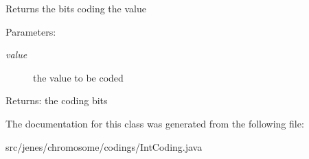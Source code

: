 Returns the bits coding the value

\begin{Desc}
\item[Parameters:]
\begin{description}
\item[{\em value}]the value to be coded \end{description}
\end{Desc}
\begin{Desc}
\item[Returns:]the coding bits \end{Desc}


The documentation for this class was generated from the following file:\begin{CompactItemize}
\item 
src/jenes/chromosome/codings/IntCoding.java\end{CompactItemize}
